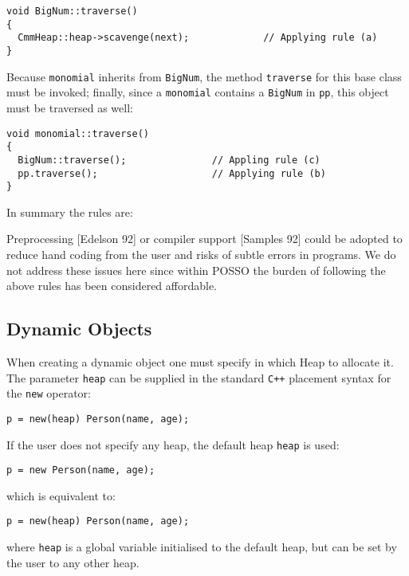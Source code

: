 \begin{verbatim}
void BigNum::traverse()
{
  CmmHeap::heap->scavenge(next);             // Applying rule (a)
}
\end{verbatim}
Because {\tt monomial} inherits from {\tt BigNum}, the method {\tt traverse}
for this base class must be invoked; finally, since a {\tt monomial} contains
a {\tt BigNum} in {\tt pp}, this object must be traversed as well:

\begin{verbatim}
void monomial::traverse()
{
  BigNum::traverse();               // Appling rule (c)
  pp.traverse();                    // Applying rule (b)
}
\end{verbatim}

In summary the rules are:


Preprocessing [Edelson 92] or compiler support [Samples 92] could be
adopted to reduce hand coding from the user and risks of subtle errors
in programs. We do not address these issues here since within POSSO
the burden of following the above rules has been considered affordable.


\subsection{Dynamic Objects}

When creating a dynamic object one must specify in which Heap to allocate it.
The parameter {\tt heap} can be supplied in the standard {\tt C++} placement
syntax for the {\tt new} operator:
\begin{verbatim}
p = new(heap) Person(name, age);
\end{verbatim}
If the user does not specify any heap, the default heap {\tt heap} is used:
\begin{verbatim}
p = new Person(name, age);
\end{verbatim}
which is equivalent to:
\begin{verbatim}
p = new(heap) Person(name, age);
\end{verbatim}
where {\tt heap} is a global variable initialised to the default heap, but can
be set by the user to any other heap.

